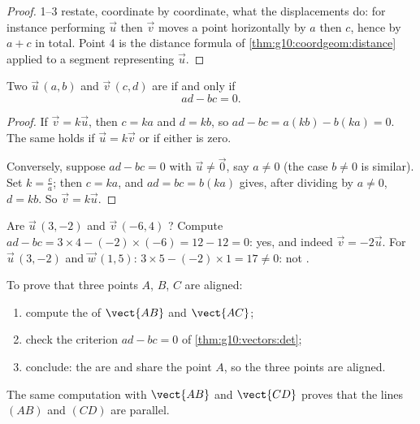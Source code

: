 \begin{proof}
1--3 restate, coordinate by coordinate, what the displacements do: for
instance performing $\vec u$ then $\vec v$ moves a point horizontally by
$a$ then $c$, hence by $a + c$ in total. Point 4 is the distance formula
of \cref{thm:g10:coordgeom:distance} applied to a segment representing
$\vec u$.
\end{proof}

\begin{theorem}\label{thm:g10:vectors:det}
Two  $\vec u\,(a, b)$ and $\vec v\,(c, d)$ are  if and
only if
\[
ad - bc = 0 .
\]
\end{theorem}

\begin{proof}
If $\vec v = k\vec u$, then $c = ka$ and $d = kb$, so
$ad - bc = a(kb) - b(ka) = 0$. The same holds if $\vec u = k \vec v$ or if
either  is zero.

Conversely, suppose $ad - bc = 0$ with $\vec u \neq \vec 0$, say
$a \neq 0$ (the case $b \neq 0$ is similar). Set $k = \frac{c}{a}$; then
$c = ka$, and $ad = bc = b(ka)$ gives, after dividing by $a \neq 0$,
$d = kb$. So $\vec v = k\vec u$.
\end{proof}

\begin{example}\label{ex:g10:vectors:det}
Are $\vec u\,(3, -2)$ and $\vec v\,(-6, 4)$ ? Compute
$ad - bc = 3 \times 4 - (-2)\times(-6) = 12 - 12 = 0$: yes, and indeed
$\vec v = -2\vec u$. For $\vec u\,(3, -2)$ and $\vec w\,(1, 5)$:
$3 \times 5 - (-2) \times 1 = 17 \neq 0$: not .
\end{example}

\begin{method}\label{met:g10:vectors:alignment}
To prove that three points $A$, $B$, $C$ are aligned:
\begin{enumerate}
  \item compute the  of $\vect{AB}$ and $\vect{AC}$;
  \item check the criterion $ad - bc = 0$ of \cref{thm:g10:vectors:det};
  \item conclude: the  are  and share the point $A$, so
        the three points are aligned.
\end{enumerate}
The same computation with $\vect{AB}$ and $\vect{CD}$ proves that the
lines $(AB)$ and $(CD)$ are parallel.
\end{method}

